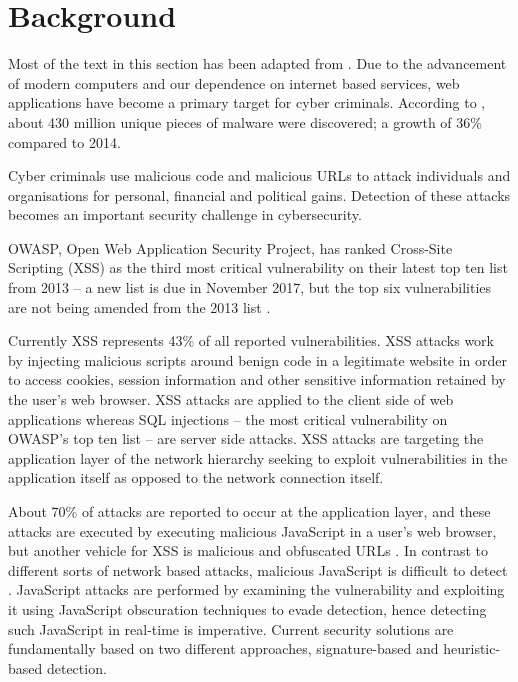 \documentclass[10pt,journal,compsoc]{IEEEtran}
\begin{document}

\section{Background}

Most of the text in this section has been adapted from \citep*{khan}.
Due to the advancement of modern computers and our dependence on internet based services,
web applications have become a primary target for cyber criminals.
According to \citep*{symantec}, about 430 million unique pieces of malware were discovered;
a growth of 36\% compared to 2014.

Cyber criminals use malicious code and malicious URLs to attack individuals and
organisations for personal, financial and political gains.
Detection of these attacks becomes an important security challenge in cybersecurity.

OWASP, Open Web Application Security Project, has ranked Cross-Site Scripting (XSS) as the third most critical
vulnerability on their latest top ten list from 2013 -- a new list is due in November 2017, but the top six
vulnerabilities are not being amended from the 2013 list \citep*{owasp}.

Currently XSS represents 43\% of all reported vulnerabilities.
XSS attacks work by injecting malicious scripts around benign code in a legitimate website in order to access cookies,
session information and other sensitive information retained by the user's web browser.
XSS attacks are applied to the client side of web applications whereas SQL injections --
the most critical vulnerability on OWASP's top ten list -- are server side attacks.
XSS attacks are targeting the application layer of the network hierarchy seeking to exploit vulnerabilities in the
application itself as opposed to the network connection itself.

About 70\% of attacks are reported to occur at the application layer, and these attacks are executed by executing
malicious JavaScript in a user's web browser, but another vehicle for XSS is malicious and obfuscated URLs \citep*{nunan}.
In contrast to different sorts of network based attacks, malicious JavaScript is difficult to detect \citep*{kloft}.
JavaScript attacks are performed by examining the vulnerability and exploiting it using JavaScript obscuration
techniques to evade detection, hence detecting such JavaScript in real-time is imperative.
Current security solutions are fundamentally based on two different approaches, signature-based
and heuristic-based detection.
\end{document}
